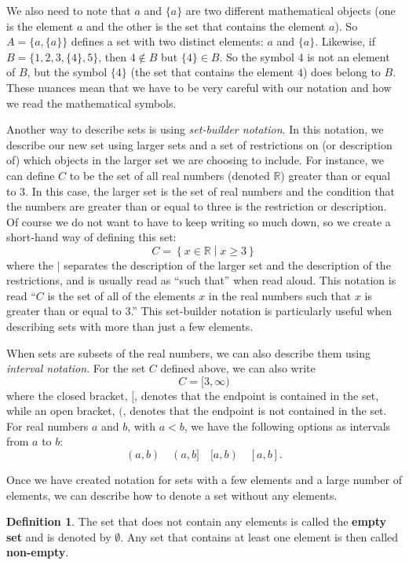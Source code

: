 \documentclass[
]{book}
\theoremstyle{definition}
\newtheorem{definition}{Definition}[chapter]
\theoremstyle{definition}
\theoremstyle{definition}
\theoremstyle{definition}
\theoremstyle{remark}
\begin{document}
We also need to note that \(a\) and \(\{a\}\) are two different mathematical objects (one is the element \(a\) and the other is the set that contains the element \(a\)). So \(A = \{a, \{a\}\}\) defines a set with two distinct elements: \(a\) and \(\{a\}\). Likewise, if \(B=\{1, 2, 3, \{4\}, 5\}\), then \(4\notin B\) but \(\{4\}\in B\). So the symbol \(4\) is not an element of \(B\), but the symbol \(\{4\}\) (the set that contains the element \(4\)) does belong to \(B\). These nuances mean that we have to be very careful with our notation and how we read the mathematical symbols.

Another way to describe sets is using \emph{set-builder notation}. In this notation, we describe our new set using larger sets and a set of restrictions on (or description of) which objects in the larger set we are choosing to include. For instance, we can define \(C\) to be the set of all real numbers (denoted \(\mathbb{R}\)) greater than or equal to \(3\). In this case, the larger set is the set of real numbers and the condition that the numbers are greater than or equal to three is the restriction or description. Of course we do not want to have to keep writing so much down, so we create a short-hand way of defining this set:
\[C = \left\{ x\in \mathbb{R} \middle \vert x\geq 3\right\}\] where the \(\vert\) separates the description of the larger set and the description of the restrictions, and is usually read as ``such that'' when read aloud. This notation is read ``\(C\) is the set of all of the elements \(x\) in the real numbers such that \(x\) is greater than or equal to 3.'' This set-builder notation is particularly useful when describing sets with more than just a few elements.

When sets are subsets of the real numbers, we can also describe them using \emph{interval notation}. For the set \(C\) defined above, we can also write
\[C=[3,\infty)\] where the closed bracket, \([\), denotes that the endpoint is contained in the set, while an open bracket, \((\), denotes that the endpoint is not contained in the set. For real numbers \(a\) and \(b\), with \(a<b\), we have the following options as intervals from \(a\) to \(b\):
\[(a,b) \quad (a,b] \quad [a,b) \quad [a,b] .\]

Once we have created notation for sets with a few elements and a large number of elements, we can describe how to denote a set without any elements.

\begin{definition}
The set that does not contain any elements is called the \textbf{empty set} and is denoted by \(\emptyset\). Any set that contains at least one element is then called \textbf{non-empty}.
\end{definition}
\end{document}
